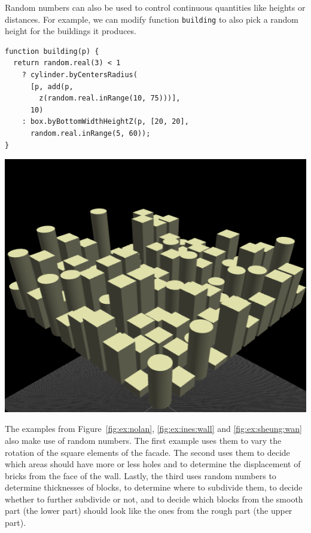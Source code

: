
Random numbers can also be used to control continuous quantities like heights or distances.
For example, we can modify function {\tt building} to also pick a random height for the buildings it produces.

\noindent
\begin{minipage}{1.0\textwidth}
\begin{minipage}{0.5\linewidth}
\begin{verbatim}
function building(p) {
  return random.real(3) < 1
    ? cylinder.byCentersRadius(
      [p, add(p,
        z(random.real.inRange(10, 75)))],
      10)
    : box.byBottomWidthHeightZ(p, [20, 20],
      random.real.inRange(5, 60));
}
\end{verbatim}
\end{minipage}%
\begin{minipage}{0.5\linewidth}
  \includegraphics[width=1.0\linewidth]{./images/detail_examples/box_cyl_city_random_crop}
\end{minipage}
\end{minipage}

The examples from Figure~\ref{fig:ex:nolan}, \ref{fig:ex:ines:wall} and \ref{fig:ex:sheung:wan} also make use of random numbers.
The first example uses them to vary the rotation of the square elements of the facade.
The second uses them to decide which areas should have more or less holes and to determine the displacement of bricks from the face of the wall.
Lastly, the third uses random numbers to determine thicknesses of blocks, to determine where to subdivide them, to decide whether to further subdivide or not, and to decide which blocks from the smooth part (the lower part) should look like the ones from the rough part (the upper part).

